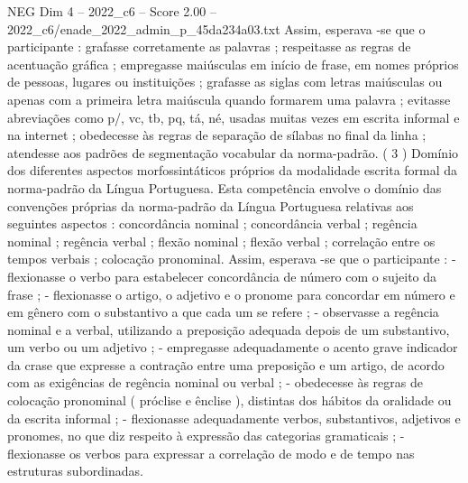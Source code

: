 \begin{textsample}{NEG Dim 4 – 2022\_c6 – Score 2.00 – 2022\_c6/enade\_2022\_admin\_p\_45da234a03.txt}
Assim, esperava -se que o participante : grafasse corretamente as palavras ; respeitasse as regras de acentuação gráfica ; empregasse maiúsculas em início de frase, em nomes próprios de pessoas, lugares ou instituições ; grafasse as siglas com letras maiúsculas ou apenas com a primeira letra maiúscula quando formarem uma palavra ; evitasse abreviações como p/, vc, tb, pq, tá, né, usadas muitas vezes em escrita informal e na internet ; obedecesse às regras de separação de sílabas no final da linha ; atendesse aos padrões de segmentação vocabular da norma-padrão. ( 3 ) Domínio dos diferentes aspectos morfossintáticos próprios da modalidade escrita formal da norma-padrão da Língua Portuguesa.
Esta competência envolve o domínio das convenções próprias da norma-padrão da Língua Portuguesa relativas aos seguintes aspectos : concordância nominal ; concordância verbal ; regência nominal ; regência verbal ; flexão nominal ; flexão verbal ; correlação entre os tempos verbais ; colocação pronominal.
Assim, esperava -se que o participante : - flexionasse o verbo para estabelecer concordância de número com o sujeito da frase ; - flexionasse o artigo, o adjetivo e o pronome para concordar em número e em gênero com o substantivo a que cada um se refere ; - observasse a regência nominal e a verbal, utilizando a preposição adequada depois de um substantivo, um verbo ou um adjetivo ; - empregasse adequadamente o acento grave indicador da crase que expresse a contração entre uma preposição e um artigo, de acordo com as exigências de regência nominal ou verbal ; - obedecesse às regras de colocação pronominal ( próclise e ênclise ), distintas dos hábitos da oralidade ou da escrita informal ; - flexionasse adequadamente verbos, substantivos, adjetivos e pronomes, no que diz respeito à expressão das categorias gramaticais ; - flexionasse os verbos para expressar a correlação de modo e de tempo nas estruturas subordinadas.

\end{textsample}
